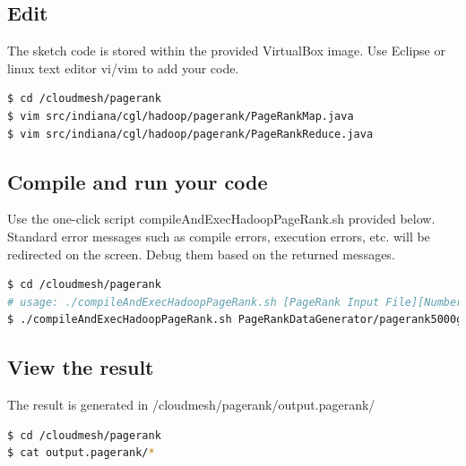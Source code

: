 \subsection{Edit}
The sketch code is stored within the provided VirtualBox image. Use Eclipse or
linux text editor vi/vim to add your code.

\begin{lstlisting}[language=bash]
$ cd /cloudmesh/pagerank
$ vim src/indiana/cgl/hadoop/pagerank/PageRankMap.java
$ vim src/indiana/cgl/hadoop/pagerank/PageRankReduce.java
\end{lstlisting}


\subsection{Compile and run your code}

Use the one-click script compileAndExecHadoopPageRank.sh provided below.
Standard error messages such as compile errors, execution errors, etc. will be
redirected on the screen. Debug them based on the returned messages.

\begin{lstlisting}[language=bash]
$ cd /cloudmesh/pagerank
# usage: ./compileAndExecHadoopPageRank.sh [PageRank Input File][Number of Urls][Number Of Iterations]
$ ./compileAndExecHadoopPageRank.sh PageRankDataGenerator/pagerank5000g50.input.0 5000 1
\end{lstlisting}

\subsection{View the result}
The result is generated in /cloudmesh/pagerank/output.pagerank/
\begin{lstlisting}[language=bash]
$ cd /cloudmesh/pagerank
$ cat output.pagerank/*
\end{lstlisting}
